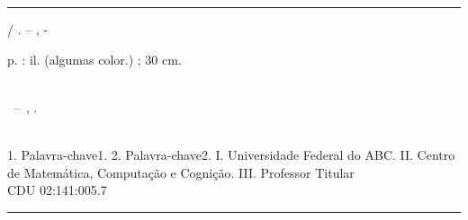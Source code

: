 %
%     
\begin{fichacatalografica}
	\vspace*{\fill}					%
	\hrule							%
	\begin{center}					%
	\begin{minipage}[c]{12.5cm}		%
	
	\imprimirautor
	
	\hspace{0.5cm} \imprimirtitulo  / \imprimirautor. --
	\imprimirlocal, \imprimirdata-
	
	\hspace{0.5cm} \pageref{LastPage} p. : il. (algumas color.) ; 30 cm.\\
	
	\hspace{0.5cm} \imprimirorientadorRotulo~\imprimirorientador\\
	
	\hspace{0.5cm}
	\parbox[t]{\textwidth}{\imprimirtipotrabalho~--~\imprimirinstituicao,
	\imprimirdata.}\\
	
	\hspace{0.5cm}
		1. Palavra-chave1.
		2. Palavra-chave2.
		I. Universidade Federal do ABC.
		II. Centro de Matemática, Computação e Cognição.
		III. Professor Titular\\ 			
	
	\hspace{8.75cm} CDU 02:141:005.7\\
	
	\end{minipage}
	\end{center}
	\hrule
\end{fichacatalografica}
